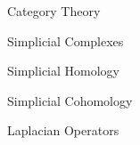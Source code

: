 \documentclass[../main.tex]{subfiles}
\begin{document}
    \begin{section}{Category Theory}
           
    \end{section}
    \begin{section}{Simplicial Complexes} 
            
    \end{section}
    \begin{section}{Simplicial Homology}
            
    \end{section}
    \begin{section}{Simplicial Cohomology}
         
    \end{section}
    \begin{section}{Laplacian Operators}
        
    \end{section}
\end{document}
